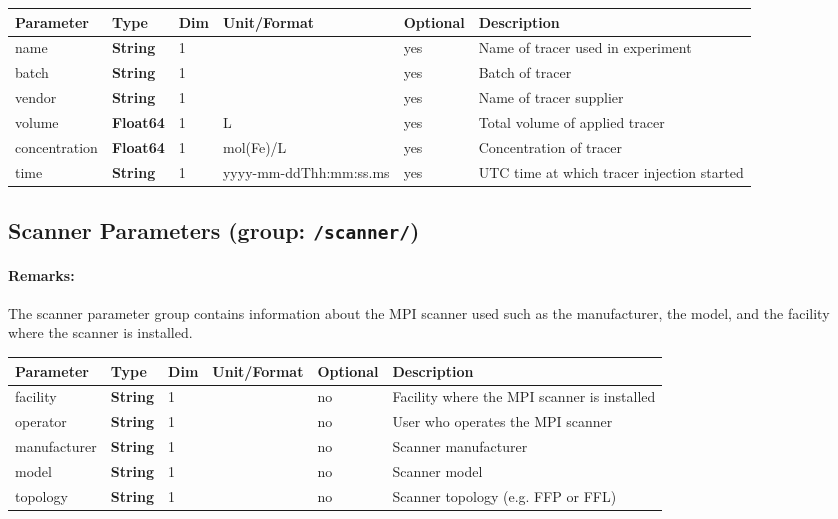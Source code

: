 \documentclass[landscape]{article} %
\newcommand{\inl}[1]{\lstinline[columns=fixed]{#1}}
\newcommand{\inltab}[1]{{\ttfamily\bfseries\color{blue}#1}}
\newcommand{\inlvar}[1]{{\ttfamily#1}}
\begin{document}
\noindent \begin{tabularx}{\columnwidth}{lllllX} 
\textbf{Parameter} & \textbf{Type} & \textbf{Dim} & \textbf{Unit/Format} & \textbf{Optional} & \textbf{Description} \\ \hline 
\inlvar{name} & \inltab{String} & 1 &  & yes & Name of tracer used in experiment \\ \hline
\inlvar{batch} & \inltab{String} & 1 & & yes & Batch of tracer \\ \hline
\inlvar{vendor} & \inltab{String} & 1 & & yes & Name of tracer supplier \\ \hline
\inlvar{volume} & \inltab{Float64} & 1 & L & yes & Total volume of applied tracer \\ \hline
\inlvar{concentration} & \inltab{Float64} & 1 & mol(Fe)/L & yes & Concentration of tracer \\ \hline
\inlvar{time} & \inltab{String} & 1 & yyyy-mm-ddThh:mm:ss.ms & yes & UTC time at which tracer injection started \\ \hline
\end{tabularx}

\subsection{Scanner Parameters (group: \inl{/scanner/})}

\begin{multicols}{2}

\paragraph{Remarks:} The scanner parameter group contains information about the MPI scanner used such as the manufacturer, the model, and the facility where the scanner is installed.

\end{multicols}


\noindent \begin{tabularx}{\columnwidth}{lllllX}
\noindent \textbf{Parameter} & \textbf{Type} & \textbf{Dim} & \textbf{Unit/Format} & \textbf{Optional} & \textbf{Description} \\ \hline 
\inlvar{facility} & \inltab{String} & 1 & & no & Facility where the MPI scanner is installed \\ \hline 
\inlvar{operator} & \inltab{String} & 1 & & no & User who operates the MPI scanner \\ \hline 
\inlvar{manufacturer} & \inltab{String} & 1 & & no & Scanner manufacturer \\ \hline 
\inlvar{model} & \inltab{String} & 1 & & no & Scanner model \\ \hline 
\inlvar{topology} & \inltab{String} & 1 & & no & Scanner topology (e.g. FFP or FFL)\\ \hline 
\end{tabularx}
\end{document}
